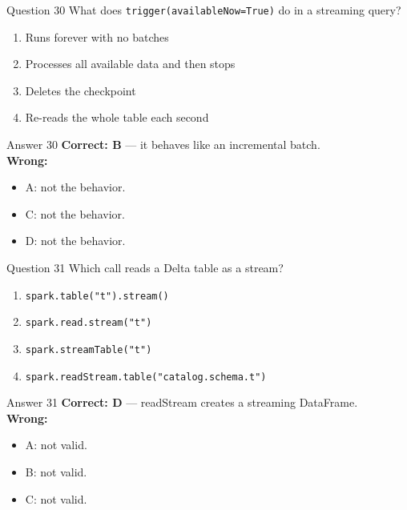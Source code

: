 \documentclass[aspectratio=169,11pt]{beamer}
\begin{document}
\begin{frame}{Question 30}
What does \texttt{trigger(availableNow=True)} do in a streaming query?
\begin{enumerate}[label=\Alph*.]
\item Runs forever with no batches
\item Processes all available data and then stops
\item Deletes the checkpoint
\item Re-reads the whole table each second
\end{enumerate}
\end{frame}
\begin{frame}{Answer 30}
\textbf{Correct: B} --- it behaves like an incremental batch.\\
\vspace{0.5em}
\textbf{Wrong:}
\begin{itemize}
\item A: not the behavior.
\item C: not the behavior.
\item D: not the behavior.
\end{itemize}
\end{frame}

\begin{frame}{Question 31}
Which call reads a Delta table as a stream?
\begin{enumerate}[label=\Alph*.]
\item \texttt{spark.table("t").stream()}
\item \texttt{spark.read.stream("t")}
\item \texttt{spark.streamTable("t")}
\item \texttt{spark.readStream.table("catalog.schema.t")}
\end{enumerate}
\end{frame}
\begin{frame}{Answer 31}
\textbf{Correct: D} --- readStream creates a streaming DataFrame.\\
\vspace{0.5em}
\textbf{Wrong:}
\begin{itemize}
\item A: not valid.
\item B: not valid.
\item C: not valid.
\end{itemize}
\end{frame}
\end{document}
